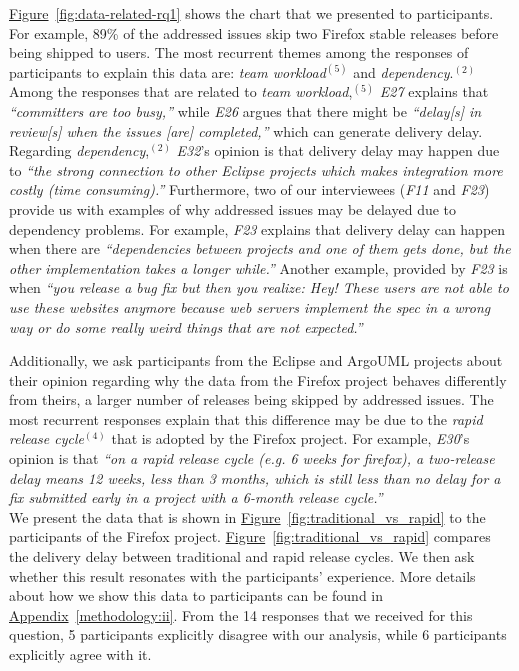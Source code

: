 \hyperref[fig:data-related-rq1]{Figure}~\ref{fig:data-related-rq1} shows the
chart that we presented to participants. For example, 89\% of the addressed
issues skip two Firefox stable releases before being shipped to users. The most
recurrent themes among the responses of participants to explain this data are:
{\em team workload}$^{(5)}$ and {\em dependency}.$^{(2)}$ Among the responses
that are related to {\em team workload},$^{(5)}$ {\em E27} explains that {\em
``committers  are too busy,''} while {\em E26} argues that there might be {\em
``delay[s] in review[s] when the issues [are] completed,''} which can generate
delivery delay. Regarding {\em dependency},$^{(2)}$ {\em E32}'s opinion is that
delivery delay may happen due to {\em ``the strong connection to other Eclipse
projects which makes integration more costly (time consuming).''} Furthermore,
two of our interviewees ({\em F11} and {\em F23}) provide us with examples of
why addressed issues may be delayed due to dependency problems. For example,
{\em F23} explains that delivery delay can happen when there are {\em
``dependencies between projects and one of them gets done, but the other
implementation takes a longer while.''} Another example, provided by {\em F23}
is when {\em ``you release a bug fix but then you realize: Hey! These users are
	not able to use these websites anymore because web servers implement the
	spec in a wrong way or do some really weird things that are not
expected.''}

Additionally, we ask participants from the Eclipse and ArgoUML projects about
their opinion regarding why the data from the Firefox project behaves differently from
theirs, \ie a larger number of releases being skipped by addressed issues. The
most recurrent responses explain that this difference may be due to the {\em
rapid release cycle}$^{(4)}$ that is adopted by the Firefox project. For
example, {\em E30}'s opinion is that {\em ``on a rapid release cycle
	(e.g. 6 weeks for firefox), a two-release delay means 12 weeks,
	less than 3 months, which is still less than no delay for a fix
submitted early in a project with a 6-month release cycle.''} 
\\           

\noindent{}
We present the data that is shown in
\hyperref[fig:traditional_vs_rapid]{Figure}~\ref{fig:traditional_vs_rapid} to
the participants of the Firefox project.
\hyperref[fig:traditional_vs_rapid]{Figure}~\ref{fig:traditional_vs_rapid}
compares the delivery delay between traditional and rapid release cycles. We
then ask whether this result resonates with the participants' experience. More
details about how we show this data to participants can be found in
\hyperref[methodology:ii]{Appendix}~\ref{methodology:ii}. From the 14 responses
that we received for this question, 5 participants explicitly disagree with our
analysis, while 6 participants explicitly agree with it. 

